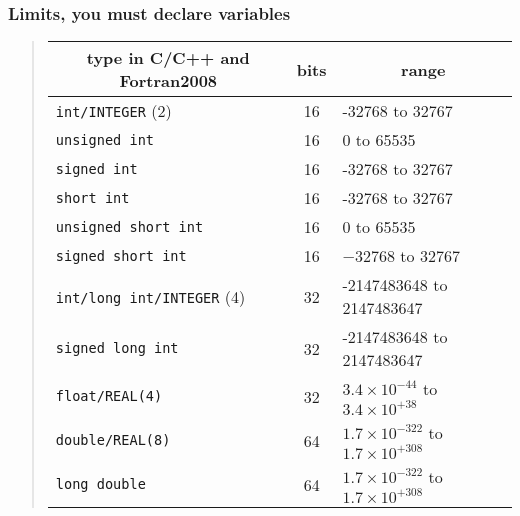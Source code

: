 \documentclass{beamer}
\newenvironment{block_mdfboxadmon}[1][]{\begin{block}{#1}}{\end{block}}
\begin{document}
\begin{frame}
\frametitle{Limits, you must declare variables}

\begin{block_mdfboxadmon}


\begin{quote}
\begin{tabular}{lcl}
\hline
\multicolumn{1}{c}{ type in C/C++ and Fortran2008 } & \multicolumn{1}{c}{ bits } & \multicolumn{1}{c}{ range } \\
\hline
\Verb!int/INTEGER! (2)                         & 16                                             & -32768 to 32767                                \\
\Verb!unsigned int!                            & 16                                             & 0 to 65535                                     \\
\Verb!signed int!                              & 16                                             & -32768 to 32767                                \\
\Verb!short int!                               & 16                                             & -32768 to 32767                                \\
\Verb!unsigned short int!                      & 16                                             & 0 to 65535                                     \\
\Verb!signed short int!                        & 16                                             & $-32768$ to 32767                              \\
\Verb!int/long int/INTEGER! (4)                & 32                                             & -2147483648 to 2147483647                      \\
\Verb!signed long int!                         & 32                                             & -2147483648 to 2147483647                      \\
\Verb!float/REAL(4)!                           & 32                                             & $3.4\times 10^{-44}$ to $3.4\times 10^{+38}$   \\
\Verb!double/REAL(8)!                          & 64                                             & $1.7\times 10^{-322}$ to $1.7\times 10^{+308}$ \\
\Verb!long double!                             & 64                                             & $1.7\times 10^{-322}$ to $1.7\times 10^{+308}$ \\
\hline
\end{tabular}
\end{quote}

\noindent
\end{block_mdfboxadmon}
\end{frame}
\end{document}
